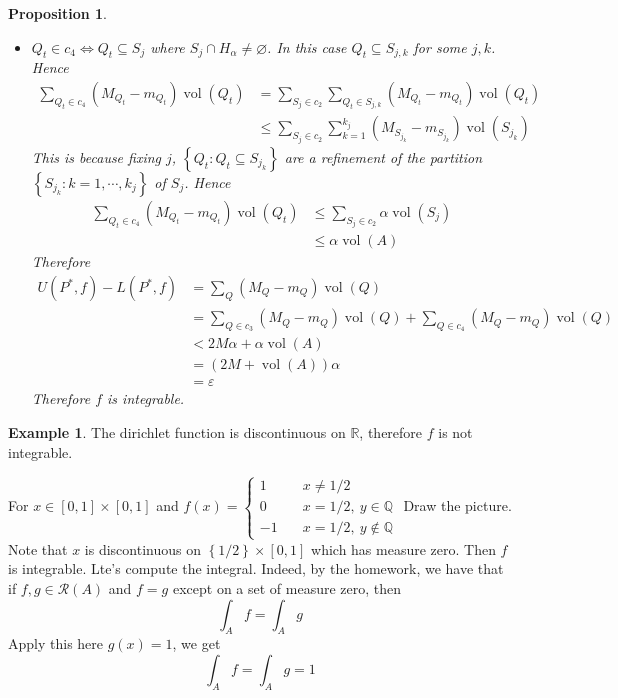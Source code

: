 \documentclass[11pt,a4paper]{article}
\theoremstyle{definition}
\newtheorem{example}[definition]{Example}
\theoremstyle{plain}
\newtheorem{proposition}[definition]{Proposition}
\theoremstyle{remark}
\newcommand{\R}{\mathbb{R}}
\newcommand{\Q}{\mathbb{Q}}
\renewcommand{\set}[1]{\left\{ #1 \right\}}
\newcommand{\vol}{\operatorname{vol}}
\begin{document}
\begin{proposition}
\begin{itemize}
\begin{itemize}
            \item $Q_t \in c_4 \iff Q_t \subseteq S_j$ where $S_j \cap H_\alpha \ne \varnothing$. In this case 
            $Q_t \subseteq S_{j,k}$ for some $j,k$. Hence 
            \begin{align*}
                \sum_{Q_t \in c_4} (M_{Q_t} - m_{Q_t}) \vol (Q_t) &= \sum_{S_j \in c_2} \sum_{Q_t \in S_{j,k}} (M_{Q_t} - m_{Q_t}) \vol (Q_t) \\
                &\le \sum_{S_j \in c_2} \sum_{k=1}^{k_j} (M_{S_{j_k}} - m_{S_{j_k}}) \vol (S_{j_k})
            \end{align*}
            This is because fixing $j$, $\set{Q_t \colon Q_t \subseteq S_{j_k}}$ are a refinement of the partition 
            $\set{S_{j_k} \colon k = 1, \cdots, k_j}$ of $S_j$. Hence 
            \begin{align*}
                \sum_{Q_t \in c_4} (M_{Q_t} - m_{Q_t}) \vol (Q_t) &\le \sum_{S_j \in c_2} \alpha \vol (S_j) \\
                &\le \alpha \vol (A)
            \end{align*}
            Therefore 
            \begin{align*}
                U(P^*,f) - L(P^*, f) &= \sum_Q (M_Q - m_Q) \vol (Q) \\
                &= \sum_{Q \in c_3 }(M_Q - m_Q) \vol (Q) + \sum_{Q \in c_4} (M_Q - m_Q) \vol (Q) \\
                &< 2M \alpha + \alpha \vol (A) \\
                &= (2M + \vol (A)) \alpha \\
                &= \varepsilon
            \end{align*}
            Therefore $f$ is integrable.
        \end{itemize} 
    \end{itemize}
\end{proposition}

\begin{example}
    The dirichlet function is discontinuous on $\R$, therefore $f$ is not integrable. 
    
    For $x \in [0,1] \times [0,1]$ and $f(x) = \begin{cases}
        1 \quad &x \ne 1/2 \\
        0 \quad &x = 1/2,  \ y \in \Q \\
        -1 \quad & x = 1/2, \ y \not\in \Q
    \end{cases}$
    Draw the picture. Note that $x$ is discontinuous on $\set{1/2} \times [0,1]$ which has measure zero. Then $f$ is integrable. Lte's compute the integral. 
    Indeed, by the homework, we have that if $f, g \in \mathcal{R}(A)$ and $f = g$ except on a set of measure zero, then 
    $$\int_A f = \int_A g$$
    Apply this here $g(x) =1$, we get 
    $$\int_A f = \int_A g = 1$$
\end{example}
\end{document}
